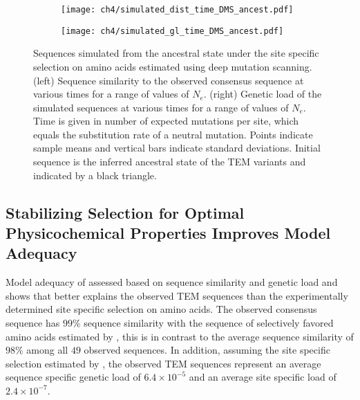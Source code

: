 \begin{figure}
    \centering
    \begin{subfigure}
        \centering
        \texttt{[image: ch4/simulated\_dist\_time\_DMS\_ancest.pdf]}
    \end{subfigure}
    \begin{subfigure}
        \centering
        \texttt{[image: ch4/simulated\_gl\_time\_DMS\_ancest.pdf]}
    \end{subfigure}
    \caption{Sequences simulated from the ancestral state under the site specific selection on amino acids estimated using deep mutation scanning. 
    (left) Sequence similarity to the observed consensus sequence at various times for a range of values of $N_e$.
    (right) Genetic load of the simulated sequences at various times for a range of values of $N_e$.
    Time is given in number of expected mutations per site, which equals the substitution rate of a neutral mutation.
    Points indicate sample means and vertical bars indicate standard deviations. Initial sequence is the inferred ancestral state of the TEM variants and indicated by a black triangle.}
    \label{fig:dms_sim}
\end{figure}

\subsection{Stabilizing Selection for Optimal Physicochemical Properties Improves Model Adequacy} 
Model adequacy of \selac assessed based on sequence similarity and genetic load and shows that \selac better explains the observed TEM sequences than the experimentally determined site specific selection on amino acids.
The observed consensus sequence has $99 \%$ sequence similarity with the sequence of selectively favored amino acids estimated by \selac, this is in contrast to the average sequence similarity of $98 \%$ among all $49$ observed sequences.
In addition, assuming the site specific selection estimated by \selac, the observed TEM sequences represent an average sequence specific genetic load of $6.4\times10^{-5}$ and an average site specific load of $2.4\times10^{-7}$.

